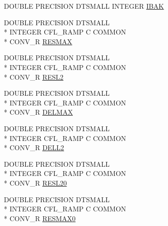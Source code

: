 \begin{DoxyCompactItemize}
\item 
D\-O\-U\-B\-L\-E P\-R\-E\-C\-I\-S\-I\-O\-N D\-T\-S\-M\-A\-L\-L I\-N\-T\-E\-G\-E\-R \hyperlink{home_2abonfi_2_c_f_d__codes_2_eul_f_s_83_84_2include_2conv_8com_aab06481a8652a66f0849ac8bba3eadca}{I\-B\-A\-K}
\item 
D\-O\-U\-B\-L\-E P\-R\-E\-C\-I\-S\-I\-O\-N D\-T\-S\-M\-A\-L\-L \\*
I\-N\-T\-E\-G\-E\-R C\-F\-L\-\_\-\-R\-A\-M\-P C C\-O\-M\-M\-O\-N \\*
C\-O\-N\-V\-\_\-\-R \hyperlink{home_2abonfi_2_c_f_d__codes_2_eul_f_s_83_84_2include_2conv_8com_a5a9ca2e120b65c5a46caf09d3a3aff16}{R\-E\-S\-M\-A\-X}
\item 
D\-O\-U\-B\-L\-E P\-R\-E\-C\-I\-S\-I\-O\-N D\-T\-S\-M\-A\-L\-L \\*
I\-N\-T\-E\-G\-E\-R C\-F\-L\-\_\-\-R\-A\-M\-P C C\-O\-M\-M\-O\-N \\*
C\-O\-N\-V\-\_\-\-R \hyperlink{home_2abonfi_2_c_f_d__codes_2_eul_f_s_83_84_2include_2conv_8com_a4c87ffcd683e561c462fb951f8fd3dba}{R\-E\-S\-L2}
\item 
D\-O\-U\-B\-L\-E P\-R\-E\-C\-I\-S\-I\-O\-N D\-T\-S\-M\-A\-L\-L \\*
I\-N\-T\-E\-G\-E\-R C\-F\-L\-\_\-\-R\-A\-M\-P C C\-O\-M\-M\-O\-N \\*
C\-O\-N\-V\-\_\-\-R \hyperlink{home_2abonfi_2_c_f_d__codes_2_eul_f_s_83_84_2include_2conv_8com_a715eab8d5cd0cd49a247520cd432061c}{D\-E\-L\-M\-A\-X}
\item 
D\-O\-U\-B\-L\-E P\-R\-E\-C\-I\-S\-I\-O\-N D\-T\-S\-M\-A\-L\-L \\*
I\-N\-T\-E\-G\-E\-R C\-F\-L\-\_\-\-R\-A\-M\-P C C\-O\-M\-M\-O\-N \\*
C\-O\-N\-V\-\_\-\-R \hyperlink{home_2abonfi_2_c_f_d__codes_2_eul_f_s_83_84_2include_2conv_8com_a95e10880467f92be3f5430f2d2ac274b}{D\-E\-L\-L2}
\item 
D\-O\-U\-B\-L\-E P\-R\-E\-C\-I\-S\-I\-O\-N D\-T\-S\-M\-A\-L\-L \\*
I\-N\-T\-E\-G\-E\-R C\-F\-L\-\_\-\-R\-A\-M\-P C C\-O\-M\-M\-O\-N \\*
C\-O\-N\-V\-\_\-\-R \hyperlink{home_2abonfi_2_c_f_d__codes_2_eul_f_s_83_84_2include_2conv_8com_a7c9ea192bf2277352d3bf39c771cfdba}{R\-E\-S\-L20}
\item 
D\-O\-U\-B\-L\-E P\-R\-E\-C\-I\-S\-I\-O\-N D\-T\-S\-M\-A\-L\-L \\*
I\-N\-T\-E\-G\-E\-R C\-F\-L\-\_\-\-R\-A\-M\-P C C\-O\-M\-M\-O\-N \\*
C\-O\-N\-V\-\_\-\-R \hyperlink{home_2abonfi_2_c_f_d__codes_2_eul_f_s_83_84_2include_2conv_8com_a6783bad88b4fdda9cf12e1788ad0a190}{R\-E\-S\-M\-A\-X0}

\end{DoxyCompactItemize}

